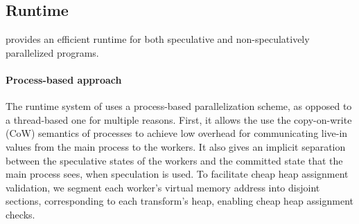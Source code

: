 \subsection{Runtime}

\name provides an efficient runtime
for both speculative and non-speculatively parallelized programs.

\paragraph{Process-based approach}
The runtime system of \name uses a process-based parallelization scheme,
as opposed to a thread-based one for multiple reasons. First, it allows the
use the copy-on-write (CoW) semantics of
processes to achieve low overhead for communicating live-in values from the
main process to the workers.
It also gives an implicit separation between the speculative states of the
workers and the committed state that the main process sees, when
speculation is used. To facilitate cheap heap assignment validation, we
segment each worker's virtual memory address into disjoint sections,
corresponding to each transform's heap, enabling cheap heap assignment
checks.

